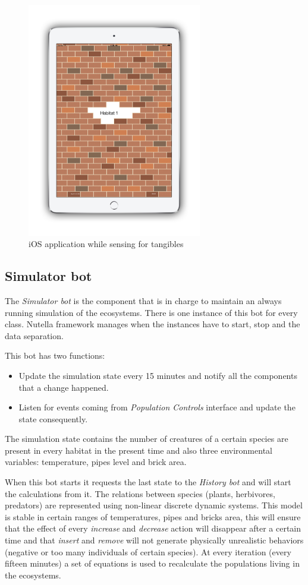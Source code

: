 \begin{figure}
\centering
\includegraphics[width=3in]{images/wallcology-ios-sensing.png}
\caption{iOS application while sensing for tangibles}
\label{fig:wallcology_ios_config_sensing}
\end{figure}

\subsection{Simulator bot}
The \textit{Simulator bot} is the component that is in charge to maintain an always running simulation of the ecosystems. There is one instance of this bot for every class. Nutella framework manages when the instances have to start, stop and the data separation.

This bot has two functions:
\begin{itemize}
\item Update the simulation state every 15 minutes and notify all the components that a change happened.
\item Listen for events coming from \textit{Population Controls} interface and update the state consequently.
\end{itemize}

The simulation state contains the number of creatures of a certain species are present in every habitat in the present time and also three environmental variables: temperature, pipes level and brick area.

When this bot starts it requests the last state to the \textit{History bot} and will start the calculations from it. The relations between species (plants, herbivores, predators) are represented using non-linear discrete dynamic systems. This model is stable in certain ranges of temperatures, pipes and bricks area, this will ensure that the effect of every \textit{increase} and \textit{decrease} action will disappear after a certain time and that \textit{insert} and \textit{remove} will not generate physically unrealistic behaviors (negative or too many individuals of certain species). At every iteration (every fifteen minutes) a set of equations is used to recalculate the populations living in the ecosystems.

